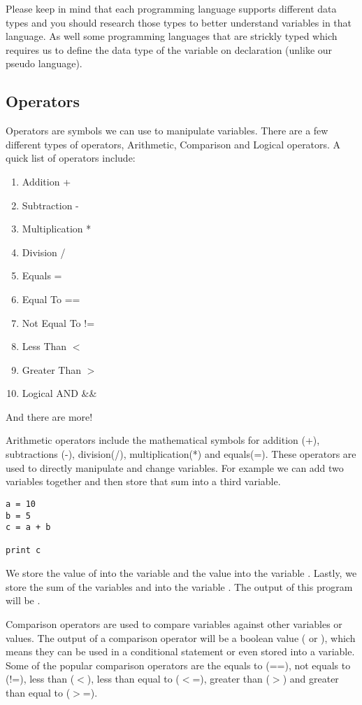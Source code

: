 Please keep in mind that each programming language supports different data types and you should research those types to better
understand variables in that language.
As well some programming languages that are strickly typed which requires us to define the data type of the
variable on declaration (unlike our pseudo language).


\subsection{Operators}
Operators are symbols we can use to manipulate variables.
There are a few different types of operators, Arithmetic, Comparison and Logical operators.
A quick list of operators include:

\begin{enumerate}
\item Addition +
\item Subtraction -
\item Multiplication *
\item Division /
\item Equals =
\item Equal To ==
\item Not Equal To !=
\item Less Than $<$
\item Greater Than $>$ 
\item Logical AND \&\&
\end{enumerate}

And there are more!
\par

Arithmetic operators include the mathematical symbols for addition (+), subtractions (-), division(/), multiplication(*) and equals(=).
These operators are used to directly manipulate and change variables.
For example we can add two variables together and then store that sum into a third variable.

\begin{lstlisting}[caption={Addition Operator}]
a = 10
b = 5
c = a + b

print c
\end{lstlisting}

We store the value of  into the variable  and the value  into the variable .
Lastly, we store the sum of the variables  and  into the variable .
The output of this program will be .
\par

Comparison operators are used to compare variables against other variables or values.
The output of a comparison operator will be a boolean value ( or ), which means they can be used in a conditional statement or even stored into a variable.
Some of the popular comparison operators are the equals to (==), not equals to (!=), less than ($<$), less than equal to ($<$=), greater than ($>$) and greater than equal to ($>$=).

